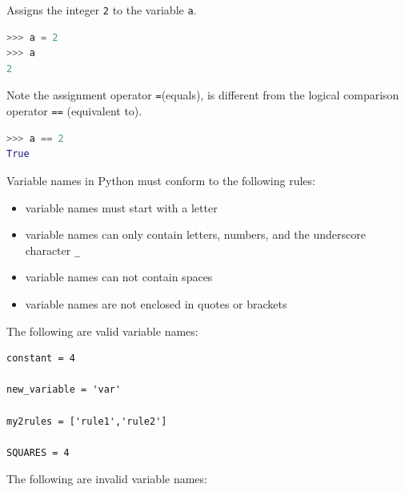 \documentclass{book}
\providecommand{\tightlist}{%
      \setlength{\itemsep}{0pt}\setlength{\parskip}{0pt}}
\begin{document}
Assigns the integer \lstinline!2! to the variable \lstinline!a!.
    




    
        \begin{lstlisting}[language=Python]
>>> a = 2
>>> a
2
\end{lstlisting}
    




    
        Note the assignment operator \lstinline!=!(equals), is different from
the logical comparison operator \lstinline!==! (equivalent to).
    




    
        \begin{lstlisting}[language=Python]
>>> a == 2
True
\end{lstlisting}
    




    
        Variable names in Python must conform to the following rules:

\begin{itemize}
\tightlist
\item
  variable names must start with a letter
\item
  variable names can only contain letters, numbers, and the underscore
  character \lstinline!_!
\item
  variable names can not contain spaces
\item
  variable names are not enclosed in quotes or brackets
\end{itemize}
    




    
        The following are valid variable names:
    




    
        \begin{lstlisting}
constant = 4

new_variable = 'var'

my2rules = ['rule1','rule2']

SQUARES = 4
\end{lstlisting}
    




    
        The following are invalid variable names:
    
\end{document}
